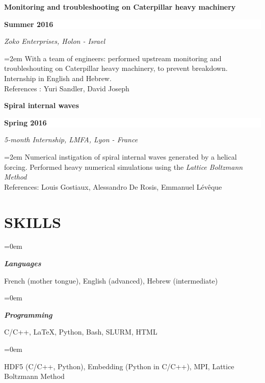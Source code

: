 \documentclass[paper=a4,fontsize=10pt]{scrartcl} %
\newcommand{\dred}{\color{dred}}
\newcommand{\bk}{\color{black}}
\newlength{\spacebox}
\newcommand{\sepspace}{\vspace*{1em}}		%
\newcommand{\NewPart}[1]{\section*{\uppercase{#1}}}
\newcommand{\PersonalEntry}[2]{
		\noindent\hangindent=2em\hangafter=0 %
		\parbox{\spacebox}{        %
		\textit{#1}}		       %
		\hspace{1.5em} #2 \par}    %
\newcommand{\SkillsEntry}[2]{      %
		\noindent\hangindent=0em\hangafter=0 %
		\parbox{\spacebox}{        %
		\textit{#1}}			   %
		\hspace{3em} #2 \par}    %
\newcommand{\EducationEntrie}[4]{
		\noindent \textbf{#1} \hfill      %
		\colorbox{white}{%
			\parbox{10em}{%
			\hfill\dred#2 }} \par  %
		\noindent \textit{#3} \par        %
		\noindent\hangindent=2em\hangafter=0 \small #4 %
		\normalsize \par}
\begin{document}
\EducationEntrie{Monitoring and troubleshooting on Caterpillar heavy machinery}{\textbf{Summer 2016}}{Zoko Enterprises, Holon - Israel}{With a team of engineers: performed upstream monitoring and troubleshouting on Caterpillar heavy machinery, to prevent breakdown. Internship in English and Hebrew. \\ \footnotesize{References : Yuri Sandler, David Joseph}}
\sepspace

\EducationEntrie{Spiral internal waves }{\textbf{Spring 2016}}{5-month Internship, LMFA\footref{note1}, Lyon - France}{Numerical instigation of spiral internal waves generated by a helical forcing. Performed heavy numerical simulations using the \textit{Lattice Boltzmann Method} \\ \footnotesize{References: Louis Gostiaux, Alessandro De Rosis, Emmanuel Lévêque}}

\NewPart{Skills}{}
\SkillsEntry{\dred \small \textbf{Languages }\bk}{French \footnotesize{(mother tongue)}, English \footnotesize{(advanced)}, Hebrew \footnotesize{(intermediate)}\\ }
\normalsize	
\SkillsEntry{\dred \small \textbf{Programming} \bk}{\footnotesize{C/C++, \LaTeX, Python, Bash, SLURM, HTML}}
\SkillsEntry{  }{\footnotesize{\hspace{0.25cm}HDF5 (C/C++, Python), Embedding (Python in C/C++), MPI, Lattice Boltzmann Method} \\}
\normalsize	
\end{document}
